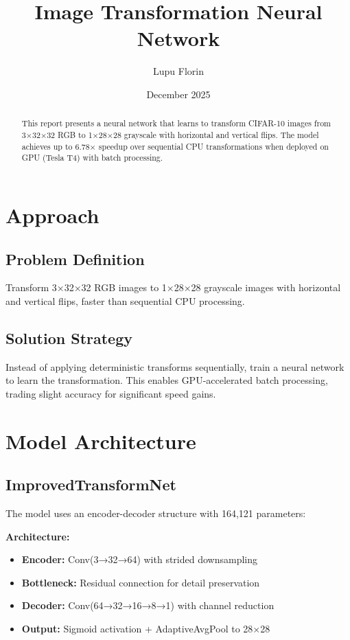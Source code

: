 \documentclass[11pt,a4paper]{article}
\title{\textbf{Image Transformation Neural Network}}
\author{Lupu Florin }
\date{December 2025}
\begin{document}
\maketitle

\begin{abstract}
This report presents a neural network that learns to transform CIFAR-10 images from 3×32×32 RGB to 1×28×28 grayscale with horizontal and vertical flips. The model achieves up to 6.78× speedup over sequential CPU transformations when deployed on GPU (Tesla T4) with batch processing.
\end{abstract}

\section{Approach}

\subsection{Problem Definition}
Transform 3×32×32 RGB images to 1×28×28 grayscale images with horizontal and vertical flips, faster than sequential CPU processing.

\subsection{Solution Strategy}
Instead of applying deterministic transforms sequentially, train a neural network to learn the transformation. This enables GPU-accelerated batch processing, trading slight accuracy for significant speed gains.

\section{Model Architecture}

\subsection{ImprovedTransformNet}

The model uses an encoder-decoder structure with 164,121 parameters:

\textbf{Architecture:}
\begin{itemize}
    \item \textbf{Encoder:} Conv(3→32→64) with strided downsampling
    \item \textbf{Bottleneck:} Residual connection for detail preservation
    \item \textbf{Decoder:} Conv(64→32→16→8→1) with channel reduction
    \item \textbf{Output:} Sigmoid activation + AdaptiveAvgPool to 28×28
\end{itemize}
\end{document}
